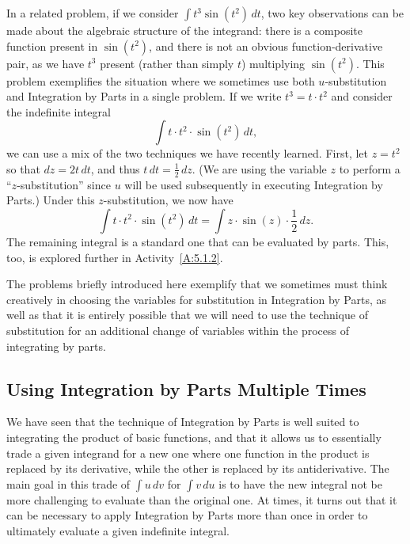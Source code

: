 In a related problem, if we consider $\int t^3 \sin(t^2) \, dt$, two key observations can be made about the algebraic structure of the integrand:  there is a composite function present in $\sin(t^2)$, and there is not an obvious function-derivative pair, as we have $t^3$ present (rather than simply $t$) multiplying $\sin(t^2)$.  This problem exemplifies the situation where we sometimes use both $u$-substitution and Integration by Parts in a single problem.  If we write $t^3 = t \cdot t^2$ and consider the indefinite integral
$$\int t \cdot t^2 \cdot \sin(t^2) \, dt,$$
we can use a mix of the two techniques we have recently learned.  First, let $z = t^2$ so that $dz = 2t \, dt$, and thus $t \, dt = \frac{1}{2} \, dz$.  (We are using the variable $z$ to perform a ``$z$-substitution'' since $u$ will be used subsequently in executing Integration by Parts.)  Under this $z$-substitution, we now have 
$$\int t \cdot t^2 \cdot \sin(t^2) \, dt = \int z \cdot \sin(z) \cdot \frac{1}{2} \, dz.$$
The remaining integral is a standard one that can be evaluated by parts.  This, too, is explored further in Activity~\ref{A:5.1.2}.

The problems briefly introduced here exemplify that we sometimes must think creatively in choosing the variables for substitution in Integration by Parts, as well as that it is entirely possible that we will need to use the technique of substitution for an additional change of variables within the process of integrating by parts.  



\subsection*{Using Integration by Parts Multiple Times} 

We have seen that the technique of Integration by Parts is well suited to integrating the product of basic functions, and that it allows us to essentially trade a given integrand for a new one where one function in the product is replaced by its derivative, while the other is replaced by its antiderivative.  The main goal in this trade of $\int u \, dv$ for $\int v \, du$ is to have the new integral not be more challenging to evaluate than the original one.  At times, it turns out that it can be necessary to apply Integration by Parts more than once in order to ultimately evaluate a given indefinite integral.

